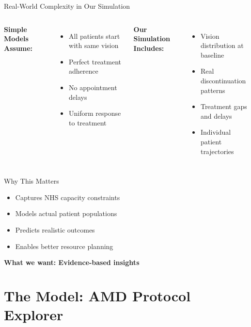 \documentclass[10pt,aspectratio=169]{beamer}
\begin{document}
\begin{frame}{Real-World Complexity in Our Simulation}
\small %
\begin{alertblock}{}
\vskip0.2cm
\begin{columns}[T]
\textbf{Simple Models Assume:}
\begin{itemize}
    \item All patients start with same vision
    \item Perfect treatment adherence
    \item No appointment delays
    \item Uniform response to treatment
\end{itemize}

\textbf{Our Simulation Includes:}
\begin{itemize}
    \item Vision distribution at baseline
    \item Real discontinuation patterns
    \item Treatment gaps and delays
    \item Individual patient trajectories
\end{itemize}
\end{columns}
\end{alertblock}


\begin{block}{Why This Matters}
\begin{itemize}
    \item Captures NHS capacity constraints
    \item Models actual patient populations
    \item Predicts realistic outcomes
    \item Enables better resource planning
\end{itemize}
\end{block}

\centering
\textbf{What we want: Evidence-based insights}
\end{frame}

\section{The Model: AMD Protocol Explorer}
\end{document}
